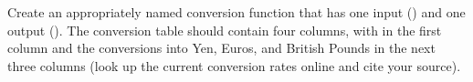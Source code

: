 {Create an appropriately named conversion function that has one input () and one output ().  The conversion table should contain four columns, with  in the first column and the conversions into Yen, Euros, and British Pounds in the next three columns (look up the current conversion rates online and cite your source).}   
{}
